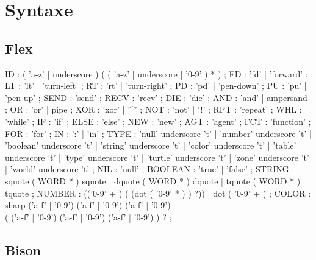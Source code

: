 \section{Syntaxe}

\subsection{Flex}

\begin{rail}
	ID : ( 'a-z' | underscore ) ( ( 'a-z'  | underscore | '0-9' ) * ) ;
	FD : 'fd' | 'forward'	;
	LT : 'lt' | 'turn-left'	;
	RT : 'rt' | 'turn-right' ;
	PD : 'pd' | 'pen-down' ;
	PU : 'pu' | 'pen-up' ;
	SEND : 'send'	;
	RECV : 'recv'	;
	DIE : 'die'	;
	AND : 'and' | ampersand ;
	OR : 'or' | pipe ;
	XOR : 'xor' | '\^{}' ;
	NOT : 'not' | '!'	;
	RPT : 'repeat' ;
	WHL : 'while' ;
	IF : 'if' ;
	ELSE : 'else' ;
	NEW : 'new' ;
	AGT : 'agent' ;
	FCT : 'function' ;
	FOR : 'for' ;
	IN : ':' | 'in' ;
	TYPE : 'null' underscore 't' 
			 | 'number' underscore 't' 
			 | 'boolean' underscore 't' 
			 | 'string' underscore 't'
			 | 'color' underscore 't'
			 | 'table' underscore 't'
			 | 'type' underscore 't'
			 | 'turtle' underscore 't'
			 | 'zone' underscore 't'
			 | 'world' underscore 't'
			 ;
	NIL : 'null' ;
	BOOLEAN : 'true' | 'false' ;
	STRING : squote ( WORD * ) squote
				 | dquote ( WORD * ) dquote
				 | tquote ( WORD * ) tquote
				 ;
	NUMBER : (('0-9' + ) ( (dot ( '0-9' * ) ) ?))
				 | dot ( '0-9' + ) ;
	COLOR : sharp ('a-f' | '0-9') ('a-f' | '0-9') ('a-f' | '0-9') \\
					( ('a-f' | '0-9') ('a-f' | '0-9') ('a-f' | '0-9') ) ? ;
\end{rail}


\subsection{Bison}

